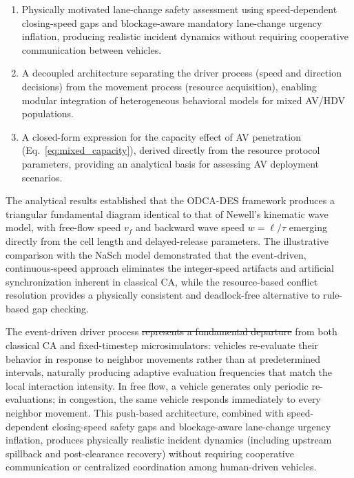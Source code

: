 \documentclass[review,number]{elsarticle} %
\providecommand{\DIFaddtex}[1]{{\protect\color{blue}\uwave{#1}}} %
\providecommand{\DIFdeltex}[1]{{\protect\color{red}\sout{#1}}}                      %
\providecommand{\DIFaddbegin}{} %
\providecommand{\DIFaddend}{} %
\providecommand{\DIFdelbegin}{} %
\providecommand{\DIFdelend}{} %
\providecommand{\DIFadd}[1]{\texorpdfstring{\DIFaddtex{#1}}{#1}} %
\providecommand{\DIFdel}[1]{\texorpdfstring{\DIFdeltex{#1}}{}} %
\newcommand{\DIFscaledelfig}{0.5}
\newlength{\DIFdelgraphicswidth} %
\newlength{\DIFdelgraphicsheight} %
\newcommand{\DIFaddincludegraphics}[2][]{{\color{blue}\fbox{\DIFOincludegraphics[#1]{#2}}}} %
\newcommand{\DIFdelincludegraphics}[2][]{%
\sbox{\DIFdelgraphicsbox}{\DIFOincludegraphics[#1]{#2}}%
\settoboxwidth{\DIFdelgraphicswidth}{\DIFdelgraphicsbox} %
\settoboxtotalheight{\DIFdelgraphicsheight}{\DIFdelgraphicsbox} %
\scalebox{\DIFscaledelfig}{%
\parbox[b]{\DIFdelgraphicswidth}{\usebox{\DIFdelgraphicsbox}\\[-\baselineskip] \rule{\DIFdelgraphicswidth}{0em}}\llap{\resizebox{\DIFdelgraphicswidth}{\DIFdelgraphicsheight}{%
\setlength{\unitlength}{\DIFdelgraphicswidth}%
\begin{picture}(1,1)%
\thicklines\linethickness{2pt} %
{\color[rgb]{1,0,0}\put(0,0){\framebox(1,1){}}}%
{\color[rgb]{1,0,0}\put(0,0){\line( 1,1){1}}}%
{\color[rgb]{1,0,0}\put(0,1){\line(1,-1){1}}}%
\end{picture}%
}\hspace*{3pt}}} %
} %
\DeclareRobustCommand{\DIFaddbegin}{\DIFOaddbegin \let\includegraphics\DIFaddincludegraphics} %
\DeclareRobustCommand{\DIFaddend}{\DIFOaddend \let\includegraphics\DIFOincludegraphics} %
\DeclareRobustCommand{\DIFdelbegin}{\DIFOdelbegin \let\includegraphics\DIFdelincludegraphics} %
\DeclareRobustCommand{\DIFdelend}{\DIFOaddend \let\includegraphics\DIFOincludegraphics} %
\begin{document}
\begin{enumerate}
    \item Physically motivated lane-change safety assessment using speed-dependent closing-speed gaps and blockage-aware mandatory lane-change urgency inflation, producing realistic incident dynamics without requiring cooperative communication between vehicles.

    \item A decoupled architecture separating the driver process (speed and direction decisions) from the movement process (resource acquisition), enabling modular integration of heterogeneous behavioral models for mixed AV/HDV populations.

    \item A closed-form expression for the capacity effect of AV penetration (Eq.~\ref{eq:mixed_capacity}), derived directly from the resource protocol parameters, providing an analytical basis for assessing AV deployment scenarios.
\end{enumerate}

The analytical results established that the ODCA-DES framework produces a triangular fundamental diagram identical to that of Newell's kinematic wave model, with free-flow speed $v_f$ and backward wave speed $w = \ell/\tau$ emerging directly from the cell length and delayed-release parameters. The illustrative comparison with the NaSch model demonstrated that the event-driven, continuous-speed approach eliminates the integer-speed artifacts and artificial synchronization inherent in classical CA, while the resource-based conflict resolution provides a physically consistent and deadlock-free alternative to rule-based gap checking.

The event-driven driver process \DIFdelbegin \DIFdel{represents a fundamental departure }\DIFdelend \DIFaddbegin \DIFadd{differs fundamentally }\DIFaddend from both classical CA and fixed-timestep microsimulators: vehicles re-evaluate their behavior in response to neighbor movements rather than at predetermined intervals, naturally producing adaptive evaluation frequencies that match the local interaction intensity. In free flow, a vehicle generates only periodic re-evaluations; in congestion, the same vehicle responds immediately to every neighbor movement. This push-based architecture, combined with speed-dependent closing-speed safety gaps and blockage-aware lane-change urgency inflation, produces physically realistic incident dynamics (including upstream spillback and post-clearance recovery) without requiring cooperative communication or centralized coordination among human-driven vehicles.
\end{document}
